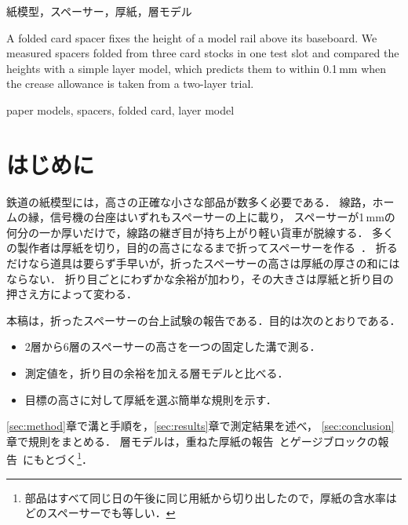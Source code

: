 \documentclass[paper]{ieicej}
\begin{document}
\begin{abstract}
折り曲げた厚紙のスペーサーは，模型の線路を台板から一定の高さに保つ．
本稿では，3種類の厚紙から折ったスペーサーを一つの試験溝で測定し，単純な層モデルによる予測と比べた．
2層の試行から折り目の余裕を求めると，モデルは折ったスペーサーの高さを0.1\,mm以内で予測できた．
溝の構造，測定の手順，残る誤差の要因を述べ，目標の高さに対して厚紙を選ぶための実用的な規則を示す．
\end{abstract}
\begin{keyword}
紙模型，スペーサー，厚紙，層モデル
\end{keyword}
\begin{eabstract}
A folded card spacer fixes the height of a model rail above its baseboard.
We measured spacers folded from three card stocks in one test slot and compared
the heights with a simple layer model, which predicts them to within 0.1\,mm when
the crease allowance is taken from a two-layer trial.
\end{eabstract}
\begin{ekeyword}
paper models, spacers, folded card, layer model
\end{ekeyword}
\maketitle

\section{はじめに}\label{sec:intro}
鉄道の紙模型には，高さの正確な小さな部品が数多く必要である．
線路，ホームの縁，信号機の台座はいずれもスペーサーの上に載り，
スペーサーが1\,mmの何分の一か厚いだけで，線路の継ぎ目が持ち上がり軽い貨車が脱線する．
多くの製作者は厚紙を切り，目的の高さになるまで折ってスペーサーを作る~\cite{desk25}．
折るだけなら道具は要らず手早いが，折ったスペーサーの高さは厚紙の厚さの和にはならない．
折り目ごとにわずかな余裕が加わり，その大きさは厚紙と折り目の押さえ方によって変わる．

本稿は，折ったスペーサーの台上試験の報告である．目的は次のとおりである．
\begin{itemize}
\item 2層から6層のスペーサーの高さを一つの固定した溝で測る．
\item 測定値を，折り目の余裕を加える層モデルと比べる．
\item 目標の高さに対して厚紙を選ぶ簡単な規則を示す．
\end{itemize}
\ref{sec:method}章で溝と手順を，\ref{sec:results}章で測定結果を述べ，
\ref{sec:conclusion}章で規則をまとめる．
層モデルは，重ねた厚紙の報告~\cite{bench24}とゲージブロックの報告~\cite{scale23}にもとづく\footnote{部品はすべて同じ日の午後に同じ用紙から切り出したので，厚紙の含水率はどのスペーサーでも等しい．}．
\end{document}
